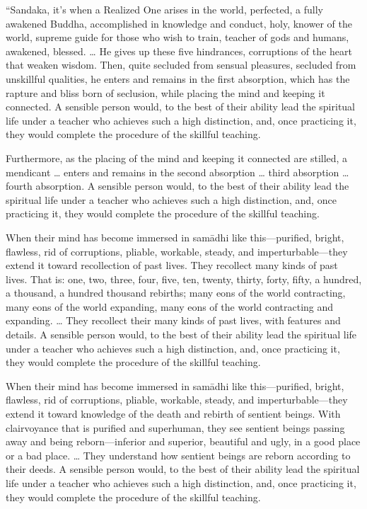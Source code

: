 \documentclass[12pt,openany]{book}%
\begin{document}
“Sandaka, it’s when a Realized One arises in the world, perfected, a fully awakened Buddha, accomplished in knowledge and conduct, holy, knower of the world, supreme guide for those who wish to train, teacher of gods and humans, awakened, blessed. … He gives up these five hindrances, corruptions of the heart that weaken wisdom. Then, quite secluded from sensual pleasures, secluded from unskillful qualities, he enters and remains in the first absorption, which has the rapture and bliss born of seclusion, while placing the mind and keeping it connected. A sensible person would, to the best of their ability lead the spiritual life under a teacher who achieves such a high distinction, and, once practicing it, they would complete the procedure of the skillful teaching. 

Furthermore, as the placing of the mind and keeping it connected are stilled, a mendicant … enters and remains in the second absorption … third absorption … fourth absorption. A sensible person would, to the best of their ability lead the spiritual life under a teacher who achieves such a high distinction, and, once practicing it, they would complete the procedure of the skillful teaching. 

When their mind has become immersed in \textsanskrit{samādhi} like this—purified, bright, flawless, rid of corruptions, pliable, workable, steady, and imperturbable—they extend it toward recollection of past lives. They recollect many kinds of past lives. That is: one, two, three, four, five, ten, twenty, thirty, forty, fifty, a hundred, a thousand, a hundred thousand rebirths; many eons of the world contracting, many eons of the world expanding, many eons of the world contracting and expanding. … They recollect their many kinds of past lives, with features and details. A sensible person would, to the best of their ability lead the spiritual life under a teacher who achieves such a high distinction, and, once practicing it, they would complete the procedure of the skillful teaching. 

When their mind has become immersed in \textsanskrit{samādhi} like this—purified, bright, flawless, rid of corruptions, pliable, workable, steady, and imperturbable—they extend it toward knowledge of the death and rebirth of sentient beings. With clairvoyance that is purified and superhuman, they see sentient beings passing away and being reborn—inferior and superior, beautiful and ugly, in a good place or a bad place. … They understand how sentient beings are reborn according to their deeds. A sensible person would, to the best of their ability lead the spiritual life under a teacher who achieves such a high distinction, and, once practicing it, they would complete the procedure of the skillful teaching. 
\end{document}
